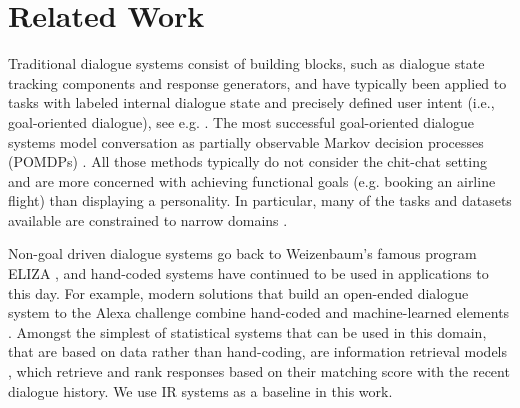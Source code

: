 \section{Related Work}

Traditional dialogue systems consist of building blocks, such as dialogue state tracking components and response generators, and have typically been applied to tasks with labeled internal dialogue state  and precisely defined user intent (i.e., goal-oriented dialogue), see e.g. \citep{young2000probabilistic}. 
The most successful goal-oriented dialogue systems model conversation as partially observable Markov decision processes (POMDPs) \citep{young2013pomdp}.
All those methods typically do not consider the chit-chat setting and are more concerned with achieving functional goals (e.g. booking an airline flight) than displaying a personality.
In particular, many of the tasks and datasets available are constrained to narrow domains \citep{serban2015survey}.

Non-goal driven dialogue systems go back to Weizenbaum's famous program ELIZA 
\citep{weizenbaum1966eliza}, and hand-coded systems have continued to be used in applications 
to this day. For example, modern solutions that build an open-ended dialogue system to the Alexa challenge  combine hand-coded and machine-learned elements \citep{serban2017deep}.
Amongst the simplest of statistical systems that can be used in this domain, that are based on data rather than hand-coding, are information retrieval models \citep{sordoni2015neural}, which retrieve and rank responses based on their matching score with the recent dialogue history.
We use IR systems as a baseline in this work.

